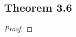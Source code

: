 \documentclass[../../main.tex]{subfiles}
\begin{document}
\subsection{Theorem 3.6}
\begin{wts}

\end{wts}
\begin{proof}

\end{proof}
\end{document}
